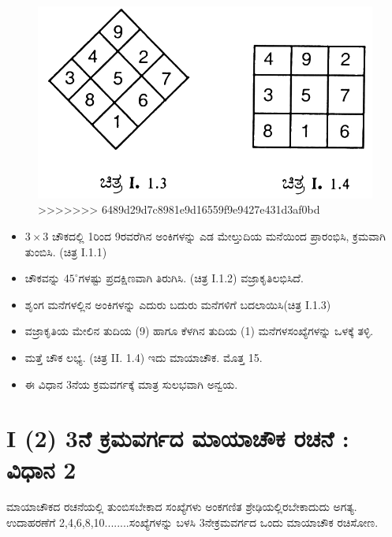 \begin{figure}[h]
\includegraphics[scale=.85]{src/figures/chap3/fig3.2.jpg}
>>>>>>> 6489d29d7c8981e9d16559f9e9427e431d3af0bd
\end{figure}

\begin{itemize}
	\item $3 \times 3$ ಚೌಕದಲ್ಲಿ 1ರಿಂದ 9ರವರೆಗಿನ ಅಂಕಿಗಳನ್ನು ಎಡ ಮೇಲ್ತುದಿಯ ಮನೆಯಿಂದ ಪ್ರಾರಂಭಿಸಿ, ಕ್ರಮವಾಗಿ ತುಂಬಿಸಿ. (ಚಿತ್ರ I.1.1)
	\item ಚೌಕವನ್ನು $45^\circ$ಗಳಷ್ಟು ಪ್ರದಕ್ಷಿಣವಾಗಿ ತಿರುಗಿಸಿ. (ಚಿತ್ರ I.1.2) ವಜ್ರಾಕೃತಿ\break ಲಭಿಸಿದೆ.
	\item ಶೃಂಗ ಮನೆಗಳಲ್ಲಿನ ಅಂಕಿಗಳನ್ನು ಎದುರು ಬದುರು ಮನೆಗಳಿಗೆ ಬದಲಾಯಿಸಿ\break (ಚಿತ್ರ I.1.3)
	\item ವಜ್ರಾಕೃತಿಯ ಮೇಲಿನ ತುದಿಯ (9) ಹಾಗೂ ಕೆಳಗಿನ ತುದಿಯ (1) ಮನೆಗಳ\break ಸಂಖ್ಯೆಗಳನ್ನು ಒಳಕ್ಕೆ ತಳ್ಳಿ.
	\item ಮತ್ತೆ ಚೌಕ ಲಭ್ಯ. (ಚಿತ್ರ II. 1.4) ಇದು ಮಾಯಾಚೌಕ. ಮೊತ್ತ 15.
	\item ಈ ವಿಧಾನ 3ನೆಯ ಕ್ರಮವರ್ಗಕ್ಕೆ ಮಾತ್ರ ಸುಲಭವಾಗಿ ಅನ್ವಯ.
\end{itemize}

\newpage

\section*{I (2) 3ನೆ ಕ್ರಮವರ್ಗದ ಮಾಯಾಚೌಕ ರಚನೆ : ವಿಧಾನ 2}

ಮಾಯಾಚೌಕದ ರಚನೆಯಲ್ಲಿ ತುಂಬಿಸಬೇಕಾದ ಸಂಖ್ಯೆಗಳು ಅಂಕಗಣಿತ ಶ್ರೇಢಿ\-ಯಲ್ಲಿರ\-ಬೇಕಾದುದು ಅಗತ್ಯ. ಉದಾಹರಣೆಗೆ 2,4,6,8,10........ಸಂಖ್ಯೆಗಳನ್ನು ಬಳಸಿ 3ನೇ\break ಕ್ರಮವರ್ಗದ ಒಂದು ಮಾಯಾಚೌಕ ರಚಿಸೋಣ.


